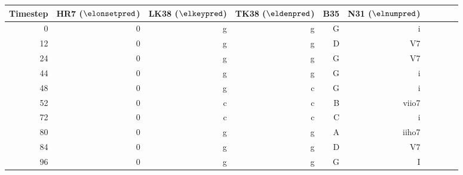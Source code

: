 \begin{tabular}{r|rrrrrrrrr}
Timestep & HR7 ($\elonsetpred$) & LK38 ($\elkeypred$) & TK38
($\eldenpred$) & B35  & N31 ($\elnumpred$)  \\ \hline
0        & 0   & g    & g    & G     & i     \\
12       & 0   & g    & g    & D     & V7    \\
24       & 0   & g    & g    & G     & V7    \\
44       & 0   & g    & g    & G     & i     \\ \hline
48       & 0   & g    & c    & G     & i     \\
52       & 0   & c    & c    & B     & viio7 \\
72       & 0   & c    & c    & C     & i     \\
80       & 0   & g    & g    & A     & iiho7 \\
84       & 0   & g    & g    & D     & V7    \\
96       & 0   & g    & g    & G     & I     \\
\end{tabular}

